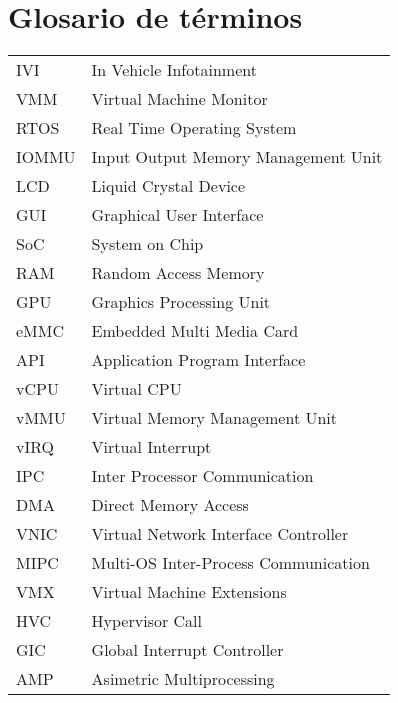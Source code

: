 \section{Glosario de términos}

\begin{tabular}{l l}
  IVI    & In Vehicle Infotainment \\
  VMM    & Virtual Machine Monitor \\
  RTOS   & Real Time Operating System \\
  IOMMU  & Input Output Memory Management Unit \\
  LCD    & Liquid Crystal Device \\
  GUI    & Graphical User Interface \\
  SoC    & System on Chip \\
  RAM    & Random Access Memory \\
  GPU    & Graphics Processing Unit \\
  eMMC   & Embedded Multi Media Card \\
  API    & Application Program Interface \\
  vCPU   & Virtual CPU \\
  vMMU   & Virtual Memory Management Unit \\
  vIRQ   & Virtual Interrupt \\
  IPC    & Inter Processor Communication \\
  DMA    & Direct Memory Access \\
  VNIC   & Virtual Network Interface Controller \\
  MIPC   & Multi-OS Inter-Process Communication \\
  VMX    & Virtual Machine Extensions \\
  HVC    & Hypervisor Call \\
  GIC    & Global Interrupt Controller \\
  AMP    & Asimetric Multiprocessing \\
\end{tabular}



\newpage
